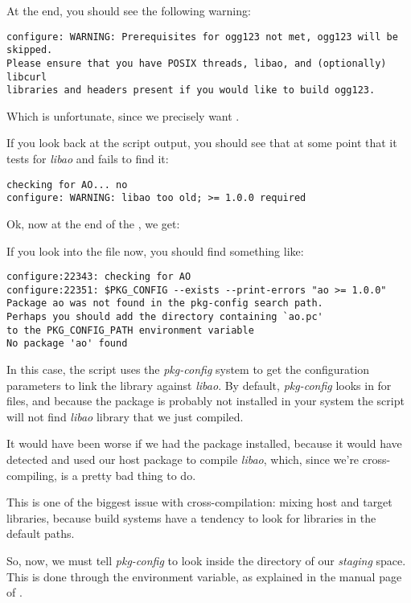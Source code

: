 At the end, you should see the following warning:

\begin{verbatim}
configure: WARNING: Prerequisites for ogg123 not met, ogg123 will be skipped.
Please ensure that you have POSIX threads, libao, and (optionally) libcurl
libraries and headers present if you would like to build ogg123.
\end{verbatim}

Which is unfortunate, since we precisely want .

If you look back at the script output, you should see that at some point
that it tests for {\em libao} and fails to find it:

\begin{verbatim}
checking for AO... no
configure: WARNING: libao too old; >= 1.0.0 required
\end{verbatim}

Ok, now at the end of the , we get:

If you look into the  file now, you should find
something like:

\begin{verbatim}
configure:22343: checking for AO
configure:22351: $PKG_CONFIG --exists --print-errors "ao >= 1.0.0"
Package ao was not found in the pkg-config search path.
Perhaps you should add the directory containing `ao.pc'
to the PKG_CONFIG_PATH environment variable
No package 'ao' found
\end{verbatim}

In this case, the  script uses the {\em pkg-config} system to
get the configuration parameters to link the library against {\em libao}. By
default, {\em pkg-config} looks in  for
 files, and because the  package is probably
not installed in your system the  script will not find
{\em libao} library that we just compiled.

It would have been worse if we had the package installed, because it
would have detected and used our host package to compile {\em libao}, which,
since we're cross-compiling, is a pretty bad thing to do.

This is one of the biggest issue with cross-compilation: mixing host
and target libraries, because build systems have a tendency to look
for libraries in the default paths.

So, now, we must tell {\em pkg-config} to look inside the
 directory of our {\em staging} space. This
is done through the  environment variable, as
explained in the manual page of .

